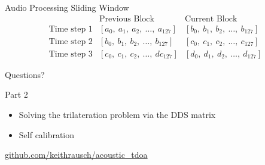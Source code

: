 \documentclass[11pt]{beamer}
\begin{document}
\begin{frame}{Audio Processing Sliding Window}
	\[
	\begin{array}{c|c|c}
		{} & \text{Previous Block} & \text{Current Block} \\[2pt]
		\hline
		\text{Time step 1} &
		[a_0,\ a_1,\ a_2,\ \ldots,\ a_{127}] &
		[b_0,\ b_1,\ b_2,\ \ldots,\ b_{127}] \\[4pt]
		
		\text{Time step 2} &
		[b_0,\ b_1,\ b_2,\ \ldots,\ b_{127}] &
		[c_0,\ c_1,\ c_2,\ \ldots,\ c_{127}] \\[4pt]
		
		\text{Time step 3} &
		[c_0,\ c_1,\ c_2,\ \ldots,\ dc_{127}] &
		[d_0,\ d_1,\ d_2,\ \ldots,\ d_{127}]
	\end{array}
	\]
\end{frame}



	
	
%	
%	
%	
%	
%    	
%    
	
	
	
%		
%		
%		
%		
	
	
	\begin{frame}
		\centering
		\Huge Questions?
	\end{frame}
	
	\begin{frame}{Part 2}
		\begin{itemize}
			\item Solving the trilateration problem via the DDS matrix
			\item Self calibration
		\end{itemize}
	\end{frame}
	
	\begin{frame}
		\centering
		\url{github.com/keithrausch/acoustic_tdoa}
	\end{frame}
	
\end{document}
